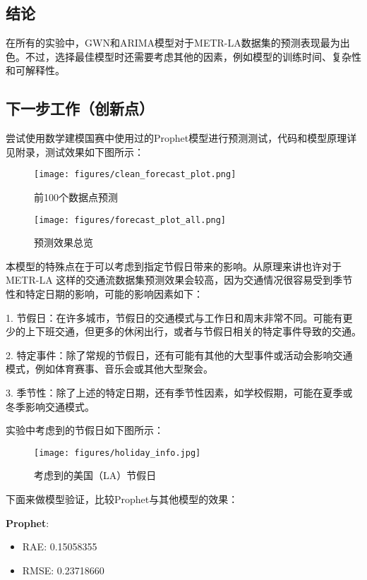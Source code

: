 \documentclass[4pt]{article}
\begin{document}
\subsection{结论}

在所有的实验中，GWN和ARIMA模型对于METR-LA数据集的预测表现最为出色。不过，选择最佳模型时还需要考虑其他的因素，例如模型的训练时间、复杂性和可解释性。

\subsection{下一步工作（创新点）}

尝试使用数学建模国赛中使用过的Prophet模型\cite{Prophet2017}进行预测测试，代码和模型原理详见附录，测试效果如下图所示：
\begin{figure}[H]
    \centering
    \texttt{[image: figures/clean\_forecast\_plot.png]}
    \caption{前100个数据点预测}
    \label{fig:your_label}
\end{figure}

\begin{figure}[H]
    \centering
    \texttt{[image: figures/forecast\_plot\_all.png]}
    \caption{预测效果总览}
    \label{fig:your_label}
\end{figure}

本模型的特殊点在于可以考虑到指定节假日带来的影响。从原理来讲也许对于 METR-LA 这样的交通流数据集预测效果会较高，因为交通情况很容易受到季节性和特定日期的影响，可能的影响因素如下：

1. 节假日：在许多城市，节假日的交通模式与工作日和周末非常不同。可能有更少的上下班交通，但更多的休闲出行，或者与节假日相关的特定事件导致的交通。

2. 特定事件：除了常规的节假日，还有可能有其他的大型事件或活动会影响交通模式，例如体育赛事、音乐会或其他大型聚会。

3. 季节性：除了上述的特定日期，还有季节性因素，如学校假期，可能在夏季或冬季影响交通模式。

实验中考虑到的节假日如下图所示：

\begin{figure}[H]
    \centering
    \texttt{[image: figures/holiday\_info.jpg]}
    \caption{考虑到的美国（LA）节假日}
    \label{fig:your_label}
\end{figure}


下面来做模型验证，比较Prophet与其他模型的效果：

\textbf{Prophet}:
\begin{itemize}
    \item RAE: 0.15058355
    \item RMSE: 0.23718660
\end{itemize}
\end{document}
